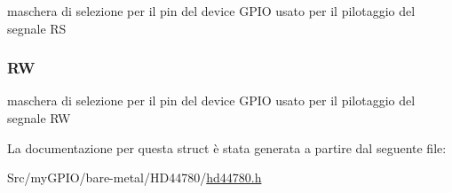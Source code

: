 maschera di selezione per il pin del device G\+P\+I\+O usato per il pilotaggio del segnale R\+S \hypertarget{struct_h_d44780___l_c_d__t_af404868fc36134454144950be4977d95}{
\subsubsection[{R\+W}]{ R\+W}}\label{struct_h_d44780___l_c_d__t_af404868fc36134454144950be4977d95}
maschera di selezione per il pin del device G\+P\+I\+O usato per il pilotaggio del segnale R\+W 

La documentazione per questa struct è stata generata a partire dal seguente file\+:\begin{DoxyCompactItemize}
\item 
Src/my\+G\+P\+I\+O/bare-\/metal/\+H\+D44780/\hyperlink{hd44780_8h}{hd44780.\+h}\end{DoxyCompactItemize}
